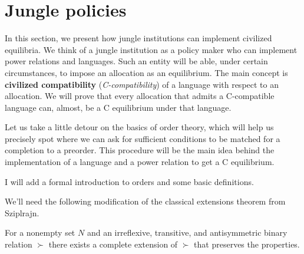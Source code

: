 
\section{Jungle policies}

In this section, we present how jungle institutions can implement civilized equilibria. We think of a jungle institution as a policy maker who can implement power relations and languages. Such an entity will be able, under certain circumstances, to impose an allocation as an equilibrium. The main concept is \textbf{civilized compatibility} (\textit{C-compatibility}) of a language with respect to an allocation. We will prove that every allocation that admits a C-compatible language can, almost, be a C equilibrium under that language.


Let us take a little detour on the basics of order theory, which will help us precisely spot where we can ask for sufficient conditions to be matched for a completion to a preorder. This procedure will be the main idea behind the implementation of a language and a power relation to get a C equilibrium.

I will add a formal introduction to orders and some basic definitions.




We'll need the following modification of the classical extensions theorem from Sziplrajn.

\begin{theorem}\label{Sziplrajn}
    For a nonempty set $N$ and an irreflexive, transitive, and antisymmetric binary relation $\succ$ there exists a complete extension of $\succ$ that preserves the properties.
\end{theorem}


